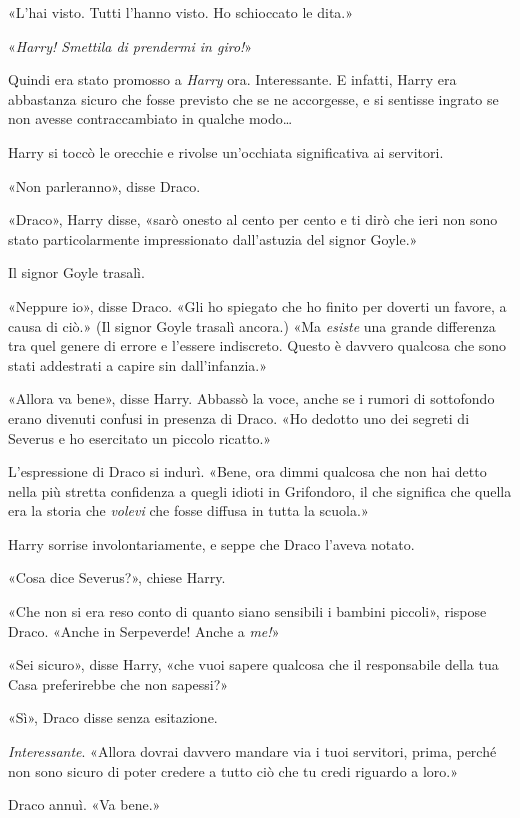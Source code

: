 «L’hai visto. Tutti l’hanno visto. Ho schioccato le dita.»

«\textit{Harry! Smettila di prendermi in giro!}»

Quindi era stato promosso a \textit{Harry} ora. Interessante. E infatti, Harry era abbastanza sicuro che fosse previsto che se ne accorgesse, e si sentisse ingrato se non avesse contraccambiato in qualche modo…

Harry si toccò le orecchie e rivolse un’occhiata significativa ai servitori.

«Non parleranno», disse Draco.

«Draco», Harry disse, «sarò onesto al cento per cento e ti dirò che ieri non sono stato particolarmente impressionato dall’astuzia del signor Goyle.»

Il signor Goyle trasalì.

«Neppure io», disse Draco. «Gli ho spiegato che ho finito per doverti un favore, a causa di ciò.» (Il signor Goyle trasalì ancora.) «Ma \textit{esiste} una grande differenza tra quel genere di errore e l’essere indiscreto. Questo è davvero qualcosa che sono stati addestrati a capire sin dall’infanzia.»

«Allora va bene», disse Harry. Abbassò la voce, anche se i rumori di sottofondo erano divenuti confusi in presenza di Draco. «Ho dedotto uno dei segreti di Severus e ho esercitato un piccolo ricatto.»

L’espressione di Draco si indurì. «Bene, ora dimmi qualcosa che non hai detto nella più stretta confidenza a quegli idioti in Grifondoro, il che significa che quella era la storia che \textit{volevi} che fosse diffusa in tutta la scuola.»

Harry sorrise involontariamente, e seppe che Draco l’aveva notato.

«Cosa dice Severus?», chiese Harry.

«Che non si era reso conto di quanto siano sensibili i bambini piccoli», rispose Draco. «Anche in Serpeverde! Anche a \textit{me!}»

«Sei sicuro», disse Harry, «che vuoi sapere qualcosa che il responsabile della tua Casa preferirebbe che non sapessi?»

«Sì», Draco disse senza esitazione.

\textit{Interessante}. «Allora dovrai davvero mandare via i tuoi servitori, prima, perché non sono sicuro di poter credere a tutto ciò che tu credi riguardo a loro.»

Draco annuì. «Va bene.»


